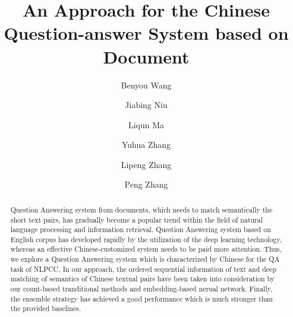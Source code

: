 \documentclass{llncs}
\begin{document}
\title{An Approach for the Chinese Question-answer System based on Document}
%
%
\author{Benyou Wang \and Jiabing Niu \and Liqun Ma \and Yuhua Zhang \and Lipeng Zhang
\and Peng Zhang}
%
%
%


\maketitle              %



\begin{abstract}
Question Answering system from documents, which {\color{red}needs} to match semantically the short text pairs, has gradually become a popular trend within the field of {\color{red}natural} language processing and information retrieval. Question Answering system based on English corpus has developed rapidly by the utilization of the deep learning technology, whereas {\color{red}an} effective Chinese-customized system {\color{red}needs} to be {\color{red}paid} more attention. Thus, we explore a Question Answering system which is characterized by Chinese for the  QA task of NLPCC. In our approach, the ordered sequential information of text and deep matching of semantics of {\color{red}Chinese} textual pairs have been taken into consideration by our count-based tranditional methods and embedding-based nerual network. Finally, the ensemble strategy {\color{red}has} achieved a good performance which is much stronger than the provided baselines. 

\end{abstract}
%
\end{document}
